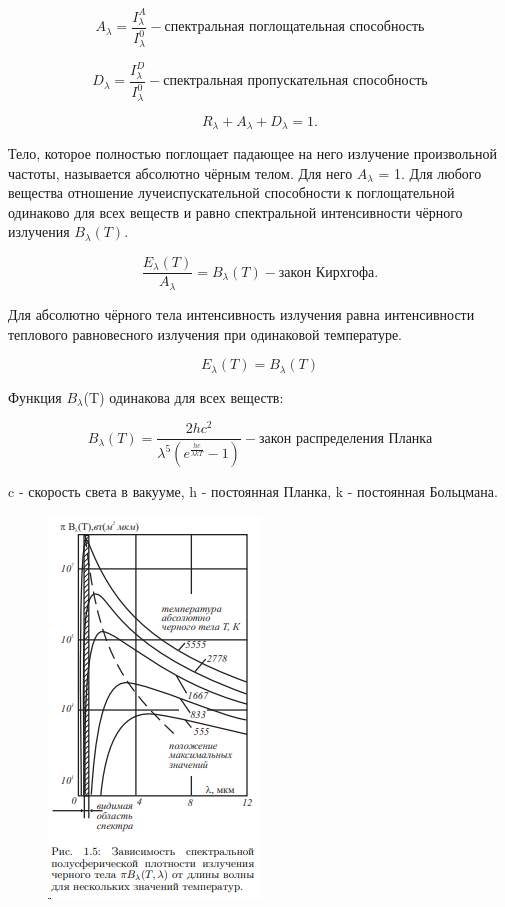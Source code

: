 \documentclass[12pt,a4paper]{article}
\begin{document}
	\begin{equation}
		A_\lambda = \frac{I_\lambda^A}{I_\lambda^0}  - \text{спектральная поглощательная способность} 
	\end{equation}
	
	\begin{equation}
		D_\lambda = \frac{I_\lambda^D}{I_\lambda^0}  - \text{спектральная пропускательная способность} 
	\end{equation}
	
	\begin{equation}
		R_\lambda + A_\lambda + D_\lambda = 1.
	\end{equation}
	
	Тело, которое полностью поглощает падающее на него излучение произвольной частоты, называется абсолютно чёрным телом. Для него $A_\lambda$ = 1. Для любого вещества отношение лучеиспускательной способности к поглощательной одинаково для всех  веществ и равно спектральной интенсивности чёрного излучения $B_\lambda(T)$.
	
	\begin{equation}
		\frac{E_\lambda(T)}{A_\lambda} = B_\lambda(T)  -  \text{закон Кирхгофа}.
	\end{equation}

	Для абсолютно чёрного тела интенсивность излучения равна интенсивности теплового равновесного излучения при одинаковой температуре.
	
	\begin{equation}
		E_\lambda(T)= B_\lambda(T) 
	\end{equation}

	Функция $B_\lambda$(T) одинакова для всех веществ:
	
	\begin{equation}
		B_\lambda(T) = \frac{2hc^2}{\lambda^5(e^{\frac{hc}{\lambda kT}} - 1)} - \text{закон распределения Планка}
	\end{equation}

	c - скорость света в вакууме, h - постоянная Планка, k  -  постоянная Больцмана. 
	
\begin{figure}[H]
	\centering
	\includegraphics[scale=1.2]{3}
	\caption{}
	\label{fig:3}
\end{figure}
\end{document}
